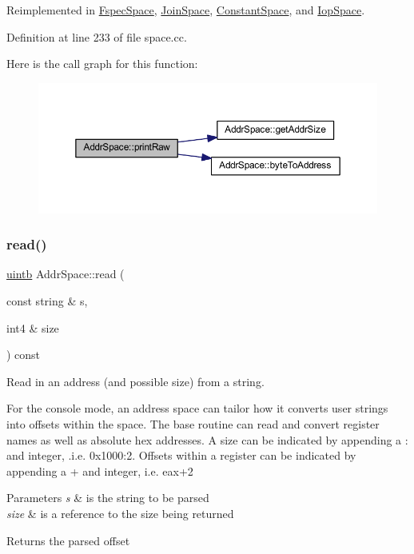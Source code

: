 Reimplemented in \mbox{\hyperlink{class_fspec_space_a48b1e30f1554fd950f5c240407ca20db}{Fspec\+Space}}, \mbox{\hyperlink{class_join_space_a23032ea3a76390d697779a99d15c75c8}{Join\+Space}}, \mbox{\hyperlink{class_constant_space_aed7e05a3024887280f12e0d7082c769e}{Constant\+Space}}, and \mbox{\hyperlink{class_iop_space_aa5e2fc99ee39d375ef563cd3fea2101d}{Iop\+Space}}.



Definition at line 233 of file space.\+cc.

Here is the call graph for this function\+:
\nopagebreak
\begin{figure}[H]
\begin{center}
\leavevmode
\includegraphics[width=350pt]{class_addr_space_a76819b70cd6b6ae8601ac1821f86b929_cgraph}
\end{center}
\end{figure}
\mbox{\label{class_addr_space_ad0a4a2744ee7de8f592dfaf817a6c93b}} 
\subsubsection{\texorpdfstring{read()}{read()}}
{\footnotesize\ttfamily \mbox{\hyperlink{types_8h_a2db313c5d32a12b01d26ac9b3bca178f}{uintb}} Addr\+Space\+::read (\begin{DoxyParamCaption}\item[{const string \&}]{s,  }\item[{int4 \&}]{size }\end{DoxyParamCaption}) const\hspace{0.3cm}{\ttfamily [virtual]}}



Read in an address (and possible size) from a string. 

For the console mode, an address space can tailor how it converts user strings into offsets within the space. The base routine can read and convert register names as well as absolute hex addresses. A size can be indicated by appending a \textquotesingle{}\+:\textquotesingle{} and integer, .i.\+e. 0x1000\+:2. Offsets within a register can be indicated by appending a \textquotesingle{}+\textquotesingle{} and integer, i.\+e. eax+2 
\begin{DoxyParams}{Parameters}
{\em s} & is the string to be parsed \\
\hline
{\em size} & is a reference to the size being returned \\
\hline
\end{DoxyParams}
\begin{DoxyReturn}{Returns}
the parsed offset 
\end{DoxyReturn}


